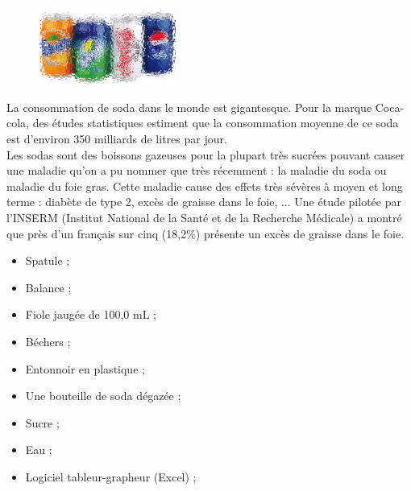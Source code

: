 
\begin{tcolorbox}[colback=orange!5!white,colframe=orange!75!black,title= Scénario:]
\begin{figure}
\vspace{-0.6cm}
    \centering
      \includegraphics[width=0.4\textwidth]{Images/Soda_flou.png}
  \end{figure}
La consommation de soda dans le monde est gigantesque. Pour la marque Coca-cola, des études statistiques estiment que la consommation moyenne de ce soda est d'environ 350 milliards de litres par jour.\\
Les sodas sont des boissons gazeuses pour la plupart très sucrées pouvant causer une maladie qu'on a pu nommer que très récemment : la maladie du soda ou maladie du foie gras. Cette maladie cause des effets très sévères à moyen et long terme : diabète de type 2, excès de graisse dans le foie, ... Une étude pilotée par l'INSERM (Institut National de la Santé et de la Recherche Médicale) a montré que près d’un français sur cinq (18,2\%) présente un excès de graisse dans le foie.

\end{tcolorbox}
\newpage

\begin{mdframed}[style=autreexo]
\textbf{}
\begin{itemize}
    \item Spatule ;
    \item Balance ;
    \item Fiole jaugée de 100,0 mL ;
    \item Béchers ;
    \item Entonnoir en plastique ;
    \item Une bouteille de soda dégazée ;
    \item Sucre ;
    \item Eau ;
    \item Logiciel tableur-grapheur (Excel) ; 
\end{itemize}
\end{mdframed}

